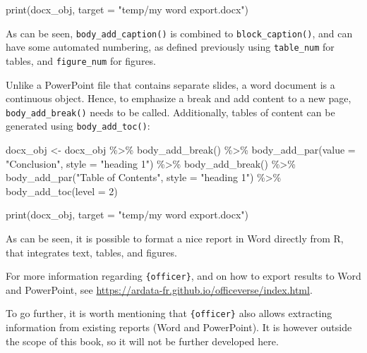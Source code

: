 \documentclass[
]{book}
\newenvironment{Shaded}{\begin{snugshade}}{\end{snugshade}}
\newcommand{\AttributeTok}[1]{\textcolor[rgb]{0.77,0.63,0.00}{#1}}
\newcommand{\DecValTok}[1]{\textcolor[rgb]{0.00,0.00,0.81}{#1}}
\newcommand{\FunctionTok}[1]{\textcolor[rgb]{0.00,0.00,0.00}{#1}}
\newcommand{\NormalTok}[1]{#1}
\newcommand{\OtherTok}[1]{\textcolor[rgb]{0.56,0.35,0.01}{#1}}
\newcommand{\SpecialCharTok}[1]{\textcolor[rgb]{0.00,0.00,0.00}{#1}}
\newcommand{\StringTok}[1]{\textcolor[rgb]{0.31,0.60,0.02}{#1}}
\begin{document}
\begin{Shaded}
\begin{Highlighting}[]
\FunctionTok{print}\NormalTok{(docx\_obj, }\AttributeTok{target =} \StringTok{"temp/my word export.docx"}\NormalTok{)}
\end{Highlighting}
\end{Shaded}

As can be seen, \texttt{body\_add\_caption()} is combined to \texttt{block\_caption()}, and can have some automated numbering, as defined previously using \texttt{table\_num} for tables, and \texttt{figure\_num} for figures.

Unlike a PowerPoint file that contains separate slides, a word document is a continuous object. Hence, to emphasize a break and add content to a new page, \texttt{body\_add\_break()} needs to be called. Additionally, tables of content can be generated using \texttt{body\_add\_toc()}:

\begin{Shaded}
\begin{Highlighting}[]
\NormalTok{docx\_obj }\OtherTok{\textless{}{-}}\NormalTok{ docx\_obj }\SpecialCharTok{\%\textgreater{}\%} 
  \FunctionTok{body\_add\_break}\NormalTok{() }\SpecialCharTok{\%\textgreater{}\%} 
  \FunctionTok{body\_add\_par}\NormalTok{(}\AttributeTok{value =} \StringTok{"Conclusion"}\NormalTok{, }\AttributeTok{style =} \StringTok{"heading 1"}\NormalTok{) }\SpecialCharTok{\%\textgreater{}\%} 
  \FunctionTok{body\_add\_break}\NormalTok{() }\SpecialCharTok{\%\textgreater{}\%}
  \FunctionTok{body\_add\_par}\NormalTok{(}\StringTok{"Table of Contents"}\NormalTok{, }\AttributeTok{style =} \StringTok{"heading 1"}\NormalTok{) }\SpecialCharTok{\%\textgreater{}\%} 
  \FunctionTok{body\_add\_toc}\NormalTok{(}\AttributeTok{level =} \DecValTok{2}\NormalTok{)}

\FunctionTok{print}\NormalTok{(docx\_obj, }\AttributeTok{target =} \StringTok{"temp/my word export.docx"}\NormalTok{)}
\end{Highlighting}
\end{Shaded}

As can be seen, it is possible to format a nice report in Word directly from R, that integrates text, tables, and figures.

For more information regarding \texttt{\{officer\}}, and on how to export results to Word and PowerPoint, see \url{https://ardata-fr.github.io/officeverse/index.html}.

To go further, it is worth mentioning that \texttt{\{officer\}} also allows extracting information from existing reports (Word and PowerPoint). It is however outside the scope of this book, so it will not be further developed here.
\end{document}

